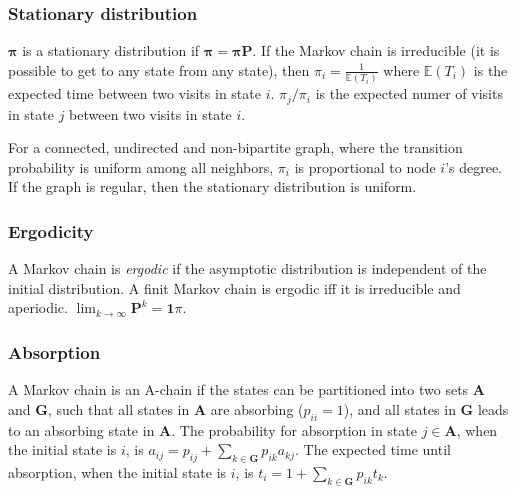 \subsubsection{Stationary distribution}
$\mathbf{\pi}$ is a stationary distribution if $\mathbf{\pi} = \mathbf{\pi P}$. If the Markov chain is irreducible (it is possible to get to any state from any state), then $\pi_i = \frac{1}{\mathbb{E}(T_i)}$ where $\mathbb{E}(T_i)$  is the expected time between two visits in state $i$. $\pi_j/\pi_i$ is the expected numer of visits in state $j$ between two visits in state $i$.

For a connected, undirected and non-bipartite graph, where the transition probability is uniform among all neighbors, $\pi_i$ is proportional to node $i$'s degree. If the graph is regular, then the stationary distribution is uniform.

\vspace{5mm} %
\subsubsection{Ergodicity}
A Markov chain is \emph{ergodic} if the asymptotic distribution is independent of the initial distribution. A finit Markov chain is ergodic iff it is irreducible and aperiodic. $\lim_{k\rightarrow\infty}\mathbf{P}^k = \mathbf{1}\pi$.

\subsubsection{Absorption}
A Markov chain is an A-chain if the states can be partitioned into two sets $\mathbf{A}$ and $\mathbf{G}$, such that all states in $\mathbf{A}$ are absorbing ($p_{ii}=1$), and all states in $\mathbf{G}$ leads to an absorbing state in $\mathbf{A}$. The probability for absorption in state $j\in\mathbf{A}$, when the initial state is $i$, is $a_{ij} = p_{ij}+\sum_{k\in\mathbf{G}} p_{ik}a_{kj}$. The expected time until absorption, when the initial state is $i$, is $t_i = 1+\sum_{k\in\mathbf{G}}p_{ik}t_k$.
